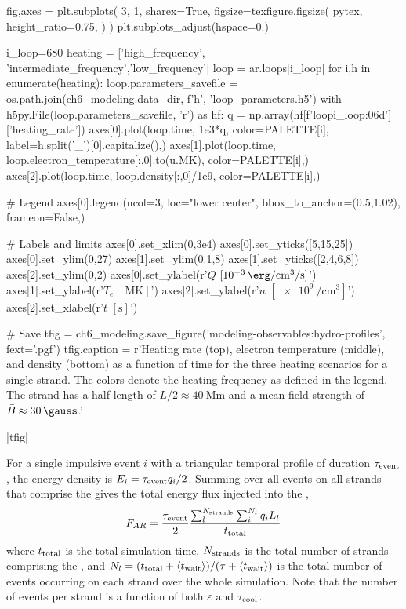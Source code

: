 \begin{pycode}
fig,axes = plt.subplots(
    3, 1, sharex=True,
    figsize=texfigure.figsize(
        pytex,
        height_ratio=0.75,
    )
)
plt.subplots_adjust(hspace=0.)

i_loop=680
heating = ['high_frequency', 'intermediate_frequency','low_frequency']
loop = ar.loops[i_loop]
for i,h in enumerate(heating):
    loop.parameters_savefile = os.path.join(ch6_modeling.data_dir, f'{h}', 'loop_parameters.h5')
    with h5py.File(loop.parameters_savefile, 'r') as hf:
        q = np.array(hf[f'loop{i_loop:06d}']['heating_rate'])
    axes[0].plot(loop.time, 1e3*q, color=PALETTE[i], label=h.split('_')[0].capitalize(),)
    axes[1].plot(loop.time, loop.electron_temperature[:,0].to(u.MK), color=PALETTE[i],)
    axes[2].plot(loop.time, loop.density[:,0]/1e9, color=PALETTE[i],)

# Legend
axes[0].legend(ncol=3, loc="lower center", bbox_to_anchor=(0.5,1.02), frameon=False,)

# Labels and limits
axes[0].set_xlim(0,3e4)
axes[0].set_yticks([5,15,25])
axes[0].set_ylim(0,27)
axes[1].set_ylim(0.1,8)
axes[1].set_yticks([2,4,6,8])
axes[2].set_ylim(0,2)
axes[0].set_ylabel(r'$Q$ $[\SI[per-mode=fraction]{e-3}{\erg\per\cubic\cm\per\second}]$')
axes[1].set_ylabel(r'$T_e$ $[\si{\mega\kelvin}]$')
axes[2].set_ylabel(r'$n$ $[\SI{e9}{\per\cubic\cm}]$')
axes[2].set_xlabel(r'$t$ $[\si{\second}]$')

# Save
tfig = ch6_modeling.save_figure('modeling-observables:hydro-profiles', fext='.pgf')
tfig.caption = r'Heating rate (top), electron temperature (middle), and density (bottom) as a function of time for the three heating scenarios for a single strand. The colors denote the heating frequency as defined in the legend. The strand has a half length of $L/2\approx\SI{40}{\mega\m}$ and a mean field strength of $\bar{B}\approx\SI{30}{\gauss}$.'
\end{pycode}
|tfig|

For a single impulsive event $i$ with a triangular temporal profile of duration $\tau_{\textup{event}}$, the energy density is $E_i=\tau_{\textup{event}}q_i/2$. Summing over all events on all strands that comprise the \AR{} gives the total energy flux injected into the \AR{},
\begin{equation}
    F_{AR} = \frac{\tau_{\textup{event}}}{2}\frac{\sum_l^{N_{\textup{strands}}}\sum_i^{N_l} q_iL_l}{t_\textup{total}}
\end{equation}
where $t_\textup{total}$ is the total simulation time, $N_\textup{strands}$ is the total number of strands comprising the \AR{}, and $N_l=(t_\textup{total} + \langle t_{\textup{wait}}\rangle)/(\tau + \langle t_{\textup{wait}}\rangle)$ is the total number of events occurring on each strand over the whole simulation. Note that the number of events per strand is a function of both $\varepsilon$ and $\tau_{\textup{cool}}$.


